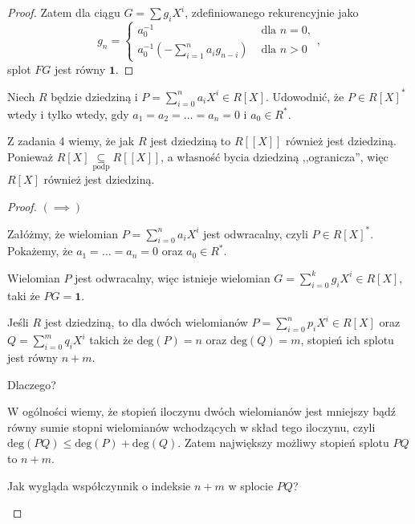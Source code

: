 \begin{solution}
\begin{proof}
		Zatem dla ciągu $G = \sum g_{i}X^{i}$, zdefiniowanego rekurencyjnie jako
		\[
		g_{n} = \begin{cases}
			a_0^{-1} &\text{ dla } n = 0, \\
			a_0^{-1}\left( - \sum_{i=1}^{n} a_{i}g_{n-i} \right) &\text{ dla } n > 0
		\end{cases}
		,\] 
		splot $FG$ jest równy  $\mathbf{1}$.
	\end{proof} 
\end{solution} 
\begin{problem}[6]
	Niech $R$ będzie dziedziną i $P = \sum_{i=0}^{n} a_{i}X^{i} \in R\left[ X \right] $. Udowodnić, że $P\in R\left[ X \right]^{\ast} $ wtedy i tylko wtedy, gdy $a_1 = a_2 = \ldots = a_{n} = 0$ i $a_0 \in R^{\ast} $.
\end{problem} 
\begin{solution}
	Z zadania 4 wiemy, że jak $R$ jest dziedziną to $R\left[ \left[ X \right]  \right] $ również jest dziedziną. Ponieważ $R\left[ X \right] \underset{\scriptscriptstyle\text{podp}}{\subseteq} R\left[ \left[ X \right]  \right] $, a własność bycia dziedziną ,,ogranicza'', więc $R\left[ X \right] $ również jest dziedziną.

	\begin{proof}
		$\bm{ \left( \implies \right)  } $ 

		Załóżmy, że wielomian $P = \sum_{i=0}^{n} a_{i}X^{i}$ jest odwracalny, czyli $P \in R\left[ X \right] ^{\ast} $.  Pokażemy, że $a_1 = \ldots = a_{n} = 0$ oraz $a_0 \in R^{\ast}$. 

		Wielomian $P$ jest odwracalny, więc istnieje wielomian $G = \sum_{i=0}^{k} g_{i}X^{i} \in R\left[ X \right] $, taki że $PG = \mathbf{1}$. 

		\begin{remark}
		
		Jeśli $R$ jest dziedziną, to dla dwóch wielomianów $P = \sum_{i=0}^{n} p_{i}X^{i} \in R\left[ X \right] $ oraz $Q = \sum_{i=0}^{m} q_{i}X^{i}$ takich że $\text{deg}\left( P \right) = n$ oraz $\text{deg}\left( Q \right) = m$, stopień ich splotu jest równy $n + m$. 

		Dlaczego?

		W ogólności wiemy, że stopień iloczynu dwóch wielomianów jest mniejszy bądź równy sumie stopni wielomianów wchodzących w skład tego iloczynu, czyli $\text{deg}\left( PQ \right) \le \text{deg}\left( P \right) + \text{deg}\left( Q \right) $. Zatem największy możliwy stopień splotu $PQ$ to $n + m$.

		Jak wygląda współczynnik o indeksie  $n + m$ w splocie $PQ$?


\end{remark}
\end{proof}
\end{solution}
